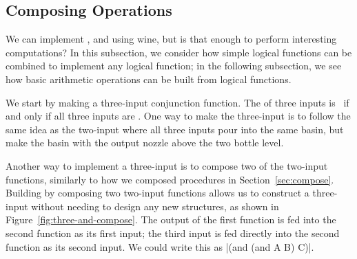 \begin{schemeregion}
\begin{figure}[ht]
{\vspace*{2ex}
}
\end{figure}

\subsection{Composing Operations}\label{sec:composingoperations}

We can implement ,  and  using wine, but is that enough to perform interesting computations? In this subsection, we consider how simple logical functions can be combined to implement any logical function; in the following subsection, we see how basic arithmetic operations can be built from logical functions.
  
We start by making a three-input conjunction function. The  of three inputs is \true\ if and only if all three inputs are \true.  One way to make the three-input  is to follow the same idea as the two-input  where all three inputs pour into the same basin, but make the basin with the output nozzle above the two bottle level. 

Another way to implement a three-input  is to compose two of the two-input  functions, similarly to how we composed procedures in Section~\ref{sec:compose}.  Building  by composing two two-input  functions allows us to construct a three-input  without needing to design any new structures, as shown in Figure~\ref{fig:three-and-compose}.  The output of the first  function is fed into the second  function as its first input; the third input is fed directly into the second  function as its second input.  We could write this as \scheme|(and (and A B) C)|.


\end{schemeregion}
